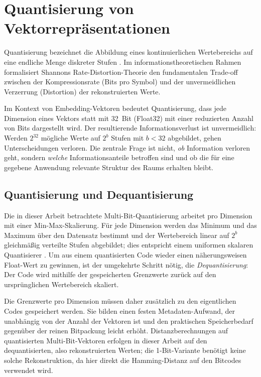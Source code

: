 \section{Quantisierung von Vektorrepräsentationen}
\label{sec:grundlagen_quantisierung}
%
Quantisierung bezeichnet die Abbildung eines kontinuierlichen Wertebereichs auf eine endliche Menge diskreter Stufen \cite{gray_1998_quantization}.
Im informationstheoretischen Rahmen formalisiert Shannons Rate-Distortion-Theorie \cite{shannon_1959_ratedistortion} den fundamentalen Trade-off zwischen der Kompressionsrate (Bits pro Symbol) und der unvermeidlichen Verzerrung (Distortion) der rekonstruierten Werte.
\par
Im Kontext von Embedding-Vektoren bedeutet Quantisierung, dass jede Dimension eines Vektors statt mit 32~Bit (Float32) mit einer reduzierten Anzahl von Bits dargestellt wird.
Der resultierende Informationsverlust ist unvermeidlich: Werden $2^{32}$ mögliche Werte auf $2^b$ Stufen mit $b < 32$ abgebildet, gehen Unterscheidungen verloren.
Die zentrale Frage ist nicht, \emph{ob} Information verloren geht, sondern \emph{welche} Informationsanteile betroffen sind und ob die für eine gegebene Anwendung relevante Struktur des Raums erhalten bleibt.
%
\subsection{Quantisierung und Dequantisierung}
%
Die in dieser Arbeit betrachtete Multi-Bit-Quantisierung arbeitet pro Dimension mit einer Min-Max-Skalierung.
Für jede Dimension werden das Minimum und das Maximum über den Datensatz bestimmt und der Wertebereich linear auf $2^b$ gleichmäßig verteilte Stufen abgebildet; dies entspricht einem uniformen skalaren Quantisierer \cite{gray_1998_quantization}.
Um aus einem quantisierten Code wieder einen näherungsweisen Float-Wert zu gewinnen, ist der umgekehrte Schritt nötig, die \emph{Dequantisierung}: Der Code wird mithilfe der gespeicherten Grenzwerte zurück auf den ursprünglichen Wertebereich skaliert.
\par
Die Grenzwerte pro Dimension müssen daher zusätzlich zu den eigentlichen Codes gespeichert werden.
Sie bilden einen festen Metadaten-Aufwand, der unabhängig von der Anzahl der Vektoren ist und den praktischen Speicherbedarf gegenüber der reinen Bitpackung leicht erhöht.
Distanzberechnungen auf quantisierten Multi-Bit-Vektoren erfolgen in dieser Arbeit auf den dequantisierten, also rekonstruierten Werten; die 1-Bit-Variante benötigt keine solche Rekonstruktion, da hier direkt die Hamming-Distanz auf den Bitcodes verwendet wird.
%
